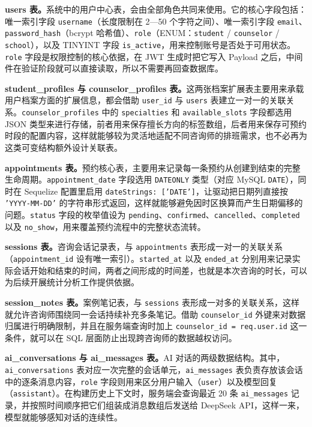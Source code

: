\textbf{users 表。}系统中的用户中心表，会由全部角色共同来使用。它的核心字段包括：唯一索引字段 \texttt{username}（长度限制在 2—50 个字符之间）、唯一索引字段 \texttt{email}、\texttt{password\_hash}（bcrypt 哈希值）、\texttt{role}（ENUM：\texttt{student} / \texttt{counselor} / \texttt{school}），以及 TINYINT 字段 \texttt{is\_active}，用来控制账号是否处于可用状态。\texttt{role} 字段是权限控制的核心依据，在 JWT 生成时把它写入 Payload 之后，中间件在验证阶段就可以直接读取，所以不需要再回查数据库。

\textbf{student\_profiles 与 counselor\_profiles 表。}这两张档案扩展表主要用来承载用户档案方面的扩展信息，都会借助 \texttt{user\_id} 与 \texttt{users} 表建立一对一的关联关系。\texttt{counselor\_profiles} 中的 \texttt{specialties} 和 \texttt{available\_slots} 字段都选用 JSON 类型来进行存储，前者用来保存擅长方向的标签数组，后者用来保存可预约时段的配置内容，这样就能够较为灵活地适配不同咨询师的排班需求，也不必再为这类可变结构额外设计关联表。

\textbf{appointments 表。}预约核心表，主要用来记录每一条预约从创建到结束的完整生命周期。\texttt{appointment\_date} 字段选用 \texttt{DATEONLY} 类型（对应 MySQL \texttt{DATE}），同时在 Sequelize 配置里启用 \texttt{dateStrings: ['DATE']}，让驱动把日期列直接按 \texttt{'YYYY-MM-DD'} 的字符串形式返回，这样就能够避免因时区换算而产生日期偏移的问题。\texttt{status} 字段的枚举值设为 \texttt{pending}、\texttt{confirmed}、\texttt{cancelled}、\texttt{completed} 以及 \texttt{no\_show}，用来覆盖预约流程中的完整状态流转。

\textbf{sessions 表。}咨询会话记录表，与 \texttt{appointments} 表形成一对一的关联关系（\texttt{appointment\_id} 设有唯一索引）。\texttt{started\_at} 以及 \texttt{ended\_at} 分别用来记录实际会话开始和结束的时间，两者之间形成的时间差，也就是本次咨询的时长，可以为后续开展统计分析工作提供依据。

\textbf{session\_notes 表。}案例笔记表，与 \texttt{sessions} 表形成一对多的关联关系，这样就允许咨询师围绕同一会话持续补充多条笔记。借助 \texttt{counselor\_id} 外键来对数据归属进行明确限制，并且在服务端查询时加上 \texttt{counselor\_id = req.user.id} 这一条件，就可以在 SQL 层面防止出现跨咨询师的数据越权访问。

\textbf{ai\_conversations 与 ai\_messages 表。}AI 对话的两级数据结构。其中，\texttt{ai\_conversations} 表对应一次完整的会话单元，\texttt{ai\_messages} 表负责存放该会话中的逐条消息内容，\texttt{role} 字段则用来区分用户输入（\texttt{user}）以及模型回复（\texttt{assistant}）。在构建历史上下文时，服务端会查询最近 20 条 \texttt{ai\_messages} 记录，并按照时间顺序把它们组装成消息数组后发送给 DeepSeek API，这样一来，模型就能够感知对话的连续性。

